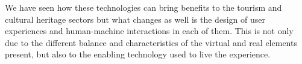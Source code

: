 


We have seen how these technologies can bring benefits to the tourism and cultural heritage sectors but what changes as well is the design of user experiences and human-machine interactions in each of them. This is not only due to the different balance and characteristics of the virtual and real elements present, but also to the enabling technology used to live the experience.
